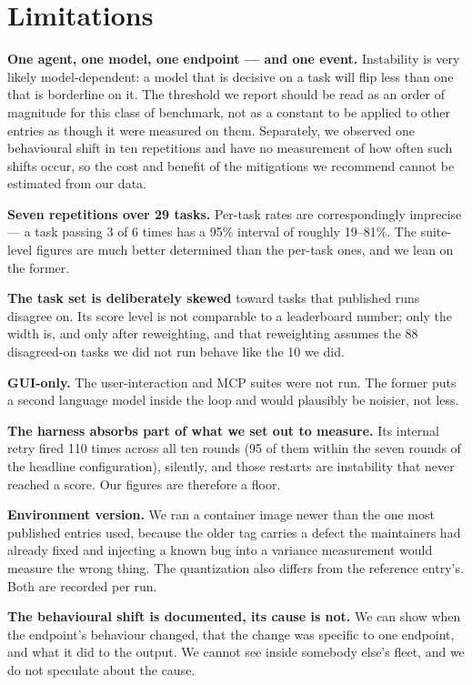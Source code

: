 \section{Limitations}

\textbf{One agent, one model, one endpoint --- and one event.} Instability is
very likely model-dependent: a model that is decisive on a task will flip less
than one that is borderline on it. The threshold we report should be read as an
order of magnitude for this class of benchmark, not as a constant to be applied
to other entries as though it were measured on them. Separately, we observed
one behavioural shift in ten repetitions and have no measurement of how often
such shifts occur, so the cost and benefit of the mitigations we recommend
cannot be estimated from our data.

\textbf{Seven repetitions over 29 tasks.} Per-task rates are correspondingly
imprecise --- a task passing 3 of 6 times has a 95\% interval of roughly
19--81\%. The suite-level figures are much better determined than the per-task
ones, and we lean on the former.

\textbf{The task set is deliberately skewed} toward tasks that published runs
disagree on. Its score level is not comparable to a leaderboard number; only
the width is, and only after reweighting, and that reweighting assumes the 88
disagreed-on tasks we did not run behave like the 10 we did.

\textbf{GUI-only.} The user-interaction and MCP suites were not run. The former
puts a second language model inside the loop and would plausibly be noisier,
not less.

\textbf{The harness absorbs part of what we set out to measure.} Its internal
retry fired 110 times across all ten rounds (95 of them within the seven rounds
of the headline configuration), silently, and those restarts are instability
that never reached a score. Our figures are therefore a floor.

\textbf{Environment version.} We ran a container image newer than the one most
published entries used, because the older tag carries a defect the maintainers
had already fixed and injecting a known bug into a variance measurement would
measure the wrong thing. The quantization also differs from the reference
entry's. Both are recorded per run.

\textbf{The behavioural shift is documented, its cause is not.} We can show when
the endpoint's behaviour changed, that the change was specific to one endpoint,
and what it did to the output. We cannot see inside somebody else's fleet, and
we do not speculate about the cause.

